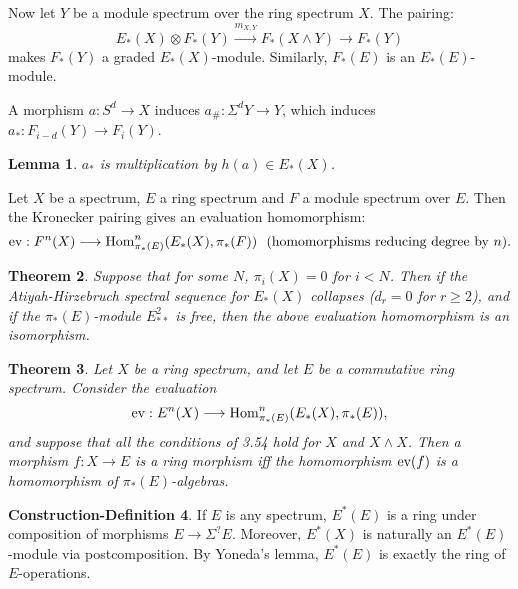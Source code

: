\documentclass[11pt]{article}
\theoremstyle{plain}
\newtheorem{thm}{Theorem}[subsection]
\newtheorem{lem}[thm]{Lemma}
\theoremstyle{definition}
\newtheorem{condef}[thm]{Construction-Definition}
\begin{document}
{Now let $Y$ be a module spectrum over the ring spectrum $X$. The pairing:
\[E_*(X)\otimes F_*(Y)\xrightarrow{m_{X,Y}}F_*(X\wedge Y)\to F_*(Y)\]
makes $F_*(Y)$ a graded $E_*(X)$-module. Similarly, $F_*(E)$ is an
$E_*(E)$-module.

A morphism $a:S^d\to X$ induces $a_\#:\Sigma^dY\to Y$, which induces
$a_*:F_{i-d}(Y)\to F_i(Y)$.
\setcounter{thm}{43}
\begin{lem}
$a_*$ is multiplication by $h(a)\in E_*(X)$.
\end{lem}
Let $X$ be a spectrum, $E$ a ring spectrum and $F$ a module spectrum over $E$.
Then the Kronecker pairing gives an evaluation homomorphism:
\[\textup{ev}:F^n(X)\to\Hom^n_{\pi_*(E)}(E_*(X),\pi_*(F))\text{\ \
(homomorphisms reducing degree by $n$)}.\]
\begin{thm}
Suppose that for some $N$, $\pi_i(X)=0$ for $i<N$. Then if the Atiyah-Hirzebruch
spectral sequence for $E_*(X)$ collapses ($d_r=0$ for $r\geq2$), and if the
$\pi_*(E)$-module $E^2_{**}$ is free, then the above evaluation homomorphism is
an isomorphism.
\end{thm}
\begin{thm}
Let $X$ be a ring spectrum, and let $E$ be a commutative ring spectrum. Consider
the evaluation
\[\textup{ev}:E^n(X)\longrightarrow\operatorname{Hom}^n_{\pi_*(E)}(E_*(X),\pi_*(E)),\]
and suppose that all the conditions of 3.54 hold for $X$ and $X\wedge X$. Then a
morphism $f:X\to E$ is a ring morphism iff the homomorphism $\textup{ev}(f)$ is
a homomorphism of $\pi_*(E)$-algebras.
\end{thm}
\begin{condef}
If $E$ is any spectrum, $E^*(E)$ is a ring under composition of morphisms $E\to
\Sigma^?E$. Moreover, $E^*(X)$ is naturally an $E^*(E)$-module via
postcomposition. By Yoneda's lemma, $E^*(E)$ is exactly the ring of
$E$-operations.
\end{condef}
}   %
\end{document}
